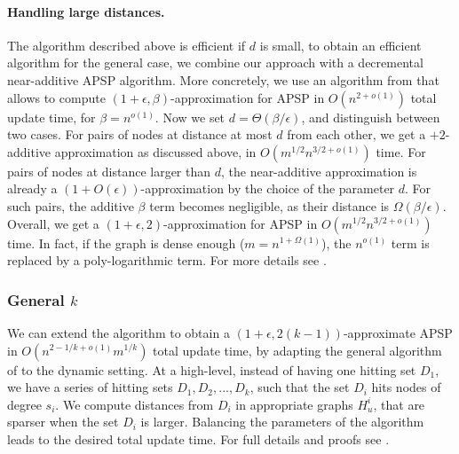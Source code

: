 \paragraph{Handling large distances.} The algorithm described above is efficient if $d$ is small, to obtain an efficient algorithm for the general case, we combine our approach with a decremental near-additive APSP algorithm. More concretely, we use an algorithm from \cite{HKN14} that allows to compute $(1+\epsilon,\beta)$-approximation for APSP in $O(n^{2+o(1)})$ total update time, for $\beta=n^{o(1)}$. Now we set $d=\Theta(\beta/\epsilon)$, and distinguish between two cases. For pairs of nodes at distance at most $d$ from each other, we get a $+2$-additive approximation as discussed above, in $O(m^{1/2}n^{3/2+o(1)})$ time. For pairs of nodes at distance larger than $d$, the near-additive approximation is already a $(1+O(\epsilon))$-approximation by the choice of the parameter $d$. For such pairs, the additive $\beta$ term becomes negligible, as their distance is $\Omega(\beta/\epsilon)$. 
Overall, we get a $(1+\epsilon,2)$-approximation for APSP in $O(m^{1/2}n^{3/2+o(1)})$ time. In fact, if the graph is dense enough ($m=n^{1+\Omega(1)}$), the $n^{o(1)}$ term is replaced by a poly-logarithmic term. For more details see . 

\subsubsection{General \texorpdfstring{$k$}{k}}
We can extend the algorithm to obtain a $(1+\epsilon,2(k-1))$-approximate APSP in $O(n^{2-1/k+o(1)}m^{1/k})$ total update time, by adapting the general algorithm of \cite{DHZ00} to the dynamic setting.
At a high-level, instead of having one hitting set $D_1$, we have a series of hitting sets $D_1,D_2,...,D_k$, such that the set $D_i$ hits nodes of degree $s_i$. We compute distances from $D_i$ in appropriate graphs $H_u^i$, that are sparser when the set $D_i$ is larger. Balancing the parameters of the algorithm leads to the desired total update time. For full details and proofs see .

